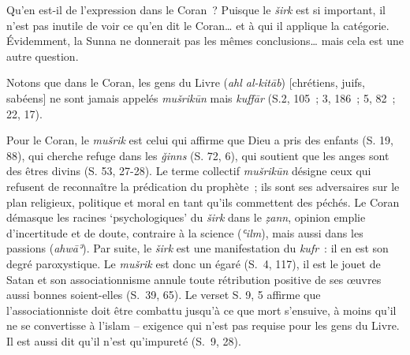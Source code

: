 Qu'en est-il de l'expression dans le Coran~? Puisque le \emph{širk} est
si important, il n'est pas inutile de voir ce qu'en dit le Coran\ldots{}
et à qui il applique la catégorie. Évidemment, la Sunna ne donnerait pas
les mêmes conclusions\ldots{} mais cela est une autre question.

Notons que dans le Coran, les gens du Livre (\emph{ahl al-kitāb})
{[}chrétiens, juifs, sabéens{]} ne sont jamais appelés \emph{mušrikūn}
mais \emph{kuffār} (S.2, 105~; 3, 186~; 5, 82~; 22, 17).

Pour le Coran, le \emph{mušrik} est celui
qui affirme que Dieu a pris des enfants (S. 19, 88), qui cherche refuge
dans les \emph{ǧinns} (S. 72, 6), qui soutient que les anges sont des
êtres divins (S. 53, 27-28). Le terme collectif \emph{mušrikūn} désigne
ceux qui refusent de reconnaître la prédication du prophète~; ils sont
ses adversaires sur le plan religieux, politique et moral en tant qu'ils
commettent des péchés. Le Coran démasque les racines `psychologiques' du
\emph{širk} dans le \emph{ẓann}, opinion emplie d'incertitude et de
doute, contraire à la science (\emph{ʿilm}),
mais aussi dans les passions (\emph{ahwāʾ}). Par suite, le \emph{širk}
est une manifestation du \emph{kufr}~: il en est son degré paroxystique.
Le \emph{mušrik} est donc un égaré (S.~4, 117), il est le jouet de Satan
et son associationnisme annule toute rétribution positive de ses œuvres
aussi bonnes soient-elles (S.~39, 65). Le
verset S. 9, 5 affirme que l'associationniste doit être combattu jusqu'à
ce que mort s'ensuive, à moins qu'il ne se convertisse à l'islam --
exigence qui n'est pas requise pour les gens du Livre. Il est aussi dit
qu'il n'est qu'impureté (S.~9, 28).

